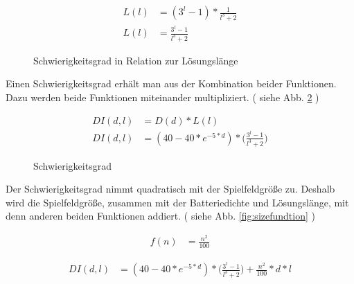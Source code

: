 \documentclass[a4paper,10pt,ngerman]{scrartcl}
\newcommand{\abbref}[1]{
  siehe Abb. \ref{#1}
}
\begin{document}
\begin{align*}
  L(l) &= (3^{l} - 1) * \frac{1}{l^{3} + 2}\\
  L(l) &= \frac{3^{l} - 1}{l^{3} + 2}
\end{align*}

\begin{figure}[ht]
  \centering
  \caption{Schwierigkeitsgrad in Relation zur Lösungslänge}
  \label{fig:lengthfunction}
\end{figure}

Einen Schwierigkeitsgrad erhält man aus der Kombination beider Funktionen. Dazu werden beide Funktionen miteinander multipliziert.
(\abbref{fig:difffunctionnosize})

\begin{align*}
  DI(d,l) &= D(d) * L(l)\\
  DI(d,l) &= (40 - 40 * e^{-5 * d}) * \bigg(\frac{3^{l} - 1}{l^{3} + 2}\bigg)
\end{align*}

\begin{figure}[ht]
  \centering
  \caption{Schwierigkeitsgrad}
  \label{fig:difffunctionnosize}
\end{figure}

Der Schwierigkeitsgrad nimmt quadratisch mit der Spielfeldgröße zu.
Deshalb wird die Spielfeldgröße, zusammen mit der Batteriedichte und Lösungslänge, mit denn anderen beiden Funktionen addiert.
(\abbref{fig:sizefundtion})

\begin{align*}
  f(n) &= \frac{n^{2}}{100}
\end{align*}

\begin{align*}
  DI(d,l) &= (40 - 40 * e^{-5 * d}) * \bigg(\frac{3^{l} - 1}{l^{3} + 2}\bigg) + \frac{n^{2}}{100} * d * l
\end{align*}
\end{document}
